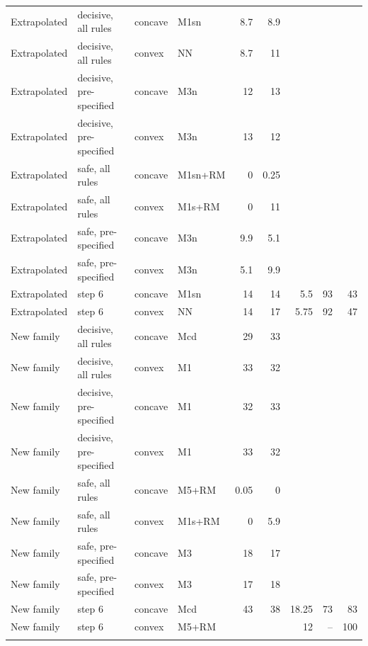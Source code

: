 \documentclass[pdflatex,sn-basic]{sn-jnl}
\begin{document}
\begin{table}[p]
\begin{tabular}{@{}llllrrrrr@{}}
Extrapolated & decisive, all rules & concave & M1sn & 8.7 & 8.9 & & & \\
Extrapolated & decisive, all rules & convex & NN & 8.7 & 11 & & & \\
Extrapolated & decisive, pre-specified & concave & M3n & 12 & 13 & & & \\
Extrapolated & decisive, pre-specified & convex & M3n & 13 & 12 & & & \\
Extrapolated & safe, all rules & concave & M1sn+RM & 0 & 0.25 & & & \\
Extrapolated & safe, all rules & convex & M1s+RM & 0 & 11 & & & \\
Extrapolated & safe, pre-specified & concave & M3n & 9.9 & 5.1 & & & \\
Extrapolated & safe, pre-specified & convex & M3n & 5.1 & 9.9 & & & \\
Extrapolated & step 6 & concave & M1sn & 14 & 14 & 5.5 & 93 & 43 \\
Extrapolated & step 6 & convex & NN & 14 & 17 & 5.75 & 92 & 47 \\
New family & decisive, all rules & concave & Mcd & 29 & 33 & & & \\
New family & decisive, all rules & convex & M1 & 33 & 32 & & & \\
New family & decisive, pre-specified & concave & M1 & 32 & 33 & & & \\
New family & decisive, pre-specified & convex & M1 & 33 & 32 & & & \\
New family & safe, all rules & concave & M5+RM & 0.05 & 0 & & & \\
New family & safe, all rules & convex & M1s+RM & 0 & 5.9 & & & \\
New family & safe, pre-specified & concave & M3 & 18 & 17 & & & \\
New family & safe, pre-specified & convex & M3 & 17 & 18 & & & \\
New family & step 6 & concave & Mcd & 43 & 38 & 18.25 & 73 & 83 \\
New family & step 6 & convex & M5+RM & & & 12 & -- & 100 \\
\botrule
\end{tabular}
\end{table}

\FloatBarrier
\end{document}
